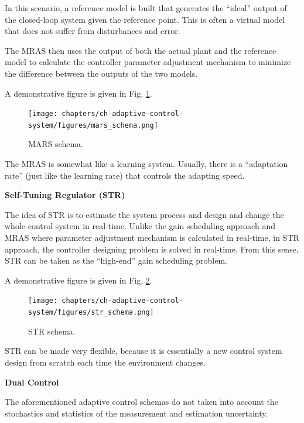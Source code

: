 In this scenario, a reference model is built that generates the “ideal” output of the closed-loop system given the reference point. This is often a virtual model that does not suffer from disturbances and error.

The MRAS then uses the output of both the actual plant and the reference model to calculate the controller parameter adjustment mechanism to minimize the difference between the outputs of the two models.

A demonstrative figure is given in Fig. \ref{ch:acs:fig:mars_schema}.

\begin{figure}
	\centering
	\texttt{[image: chapters/ch-adaptive-control-system/figures/mars\_schema.png]}
	\caption{MARS schema.} \label{ch:acs:fig:mars_schema}
\end{figure}

The MRAS is somewhat like a learning system. Usually, there is a “adaptation rate” (just like the learning rate) that controls the adapting speed.

\vspace{0.1in}
\noindent \textbf{Self-Tuning Regulator (STR)}
\vspace{0.1in}

The idea of STR is to estimate the system process and design and change the whole control system in real-time. Unlike the gain scheduling approach and MRAS where parameter adjustment mechanism is calculated in real-time, in STR approach, the controller designing problem is solved in real-time. From this sense, STR can be taken as the “high-end” gain scheduling problem.

A demonstrative figure is given in Fig. \ref{ch:acs:fig:str_schema}.

\begin{figure}
	\centering
	\texttt{[image: chapters/ch-adaptive-control-system/figures/str\_schema.png]}
	\caption{STR schema.} \label{ch:acs:fig:str_schema}
\end{figure}

STR can be made very flexible, because it is essentially a new control system design from scratch each time the environment changes.

\vspace{0.1in}
\noindent \textbf{Dual Control}
\vspace{0.1in}

The aforementioned adaptive control schemas do not taken into account the stochastics and statistics of the measurement and estimation uncertainty.

